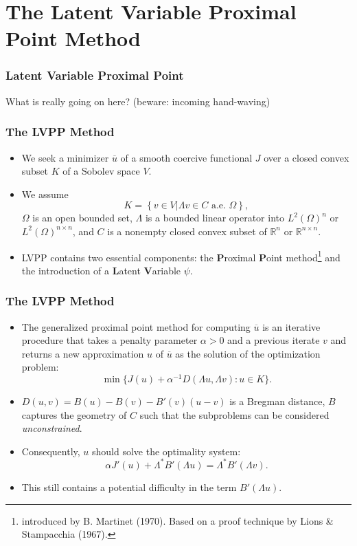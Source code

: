 \documentclass[aspectratio=169,xcolor=dvipsnames,11pt]{beamer}
\begin{document}
\section{The Latent Variable Proximal Point Method}
\begin{frame}\frametitle{Latent Variable Proximal Point}
{\Large
{\color{Maroon}
What is really going on here? (beware: incoming hand-waving)
}
}
\end{frame}

\begin{frame}\frametitle{The LVPP Method}
\begin{itemize}
\item We seek a minimizer $\overline{u}$ of a smooth coercive functional $J$ over a closed convex subset $K$ of a Sobolev space $V$. \pause
\item  We assume 
\[
K = \left\{v \in V \left| \Lambda v \in C \text{ a.e. } \Omega \right.\right\},
\] 
$\Omega$ is an open bounded set, $\Lambda$ is a bounded linear operator into $L^2(\Omega)^n$ or $L^2(\Omega)^{n\times n}$, and $C$ is a nonempty closed convex subset of $\mathbb R^n$ or $\mathbb R^{n \times n}$. \pause
\item  LVPP contains two essential components: the \textbf{P}roximal \textbf{P}oint method\footnote{\tiny introduced by B. Martinet (1970). Based on a proof technique by Lions \& Stampacchia (1967).} and the introduction of a \textbf{L}atent \textbf{V}ariable $\psi$.
\end{itemize}
\end{frame}

\begin{frame}\frametitle{The LVPP Method}
\begin{itemize}
\item The generalized proximal point method for computing $\overline{u}$ is an iterative procedure that takes a penalty parameter $\alpha > 0$ and a previous iterate $v$ and returns a new approximation $u$ of $\overline{u}$  as the solution of the optimization problem: 
\[
\min\{ J(u) + \alpha^{-1} D(\Lambda u,\Lambda v) : u \in K\}.
\] 
\item \pause $D(u,v) = B(u) - B(v) - B'(v)(u - v)$ is a Bregman distance, $B$ captures the geometry of $C$ such that the subproblems can be considered \textit{unconstrained}.
\item \pause Consequently, $u$ should solve the optimality system:
\[
\alpha J'(u) + \Lambda^* B'(\Lambda u) = \Lambda^* B'(\Lambda v).
\]
\item \pause This still contains a potential difficulty in the term $B'(\Lambda u)$.
\end{itemize}
\end{frame}
\end{document}
